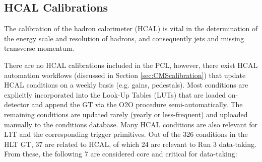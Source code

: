 \subsection{HCAL Calibrations}

The calibration of the hadron calorimeter (HCAL) is vital in the determination of the energy scale and resolution of hadrons, and consequently jets and missing transverse momentum.

There are no HCAL calibrations included in the PCL, however, there exist HCAL automation workflows (discussed in Section \ref{sec:CMScalibration}) that update HCAL conditions on a weekly basis (e.g. gains, pedestals). Most conditions are explicitly incorporated into the Look-Up Tables (LUTs) that are loaded on-detector and append the GT via the O2O procedure semi-automatically. The remaining conditions are updated rarely (yearly or less-frequent) and uploaded manually to the conditions database. Many HCAL conditions are also relevant for L1T and the corresponding trigger primitives. Out of the 326 conditions in the HLT GT, 37 are related to HCAL, of which 24 are relevant to Run 3 data-taking. From these, the following 7 are considered core and critical for data-taking:


